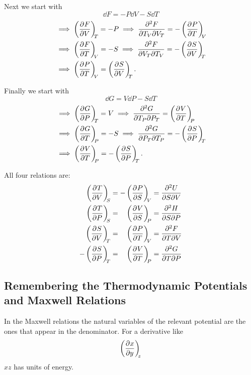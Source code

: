     Next we start with
    \[\dd{F} = -P\dd{V} - S\dd{T}\]
    \begin{align*}
        &\implies \pdvconst{F}{V}{T} = -P \implies \pdvsec{F}{T_V}{V_T} = -\pdvconst{P}{T}{V}\\
        &\implies \pdvconst{F}{T}{V} = -S \implies \pdvsec{F}{V_T}{T_V} = -\pdvconst{S}{V}{T}\\
        &\implies \pdvconst{P}{T}{V} = \pdvconst{S}{V}{T}.
    \end{align*}

    Finally we start with
    \[\dd{G} = V\dd{P} - S\dd{T}\]
    \begin{align*}
        &\implies \pdvconst{G}{P}{T} = V \implies \pdvsec{G}{T_P}{P_T} = \pdvconst{V}{T}{P}\\
        &\implies \pdvconst{G}{T}{P} = -S \implies \pdvsec{G}{P_T}{T_P} = -\pdvconst{S}{P}{T}\\
        &\implies \pdvconst{V}{T}{P} = -\pdvconst{S}{P}{T}.
    \end{align*}
    
    All four relations are:
    \begin{align*}
        \hphantom{-}\pdvconst{T}{V}{S} &= -\pdvconst{P}{S}{V} = \pdvsec{U}{S}{V} \\
        \hphantom{-}\pdvconst{T}{P}{S} &= \hphantom{-}\pdvconst{V}{S}{P} = \pdvsec{H}{S}{P} \\
        \hphantom{-}\pdvconst{S}{V}{T} &= \hphantom{-}\pdvconst{P}{T}{V} = \pdvsec{F}{T}{V} \\
        -\pdvconst{S}{P}{T} &= \hphantom{-}\pdvconst{V}{T}{P} = \pdvsec{G}{T}{P} \\
    \end{align*}
    
    \subsection{Remembering the Thermodynamic Potentials and Maxwell Relations}
    In the Maxwell relations the natural variables of the relevant potential are the ones that appear in the denominator.
    For a derivative like
    \[\left(\pdv[]{x}{y}\right)_{\!\!{z}}\]
    \(xz\) has units of energy.
    
